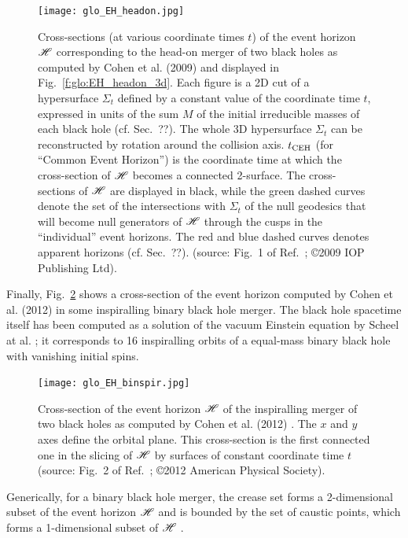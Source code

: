 \begin{figure}
\centerline{\texttt{[image: glo\_EH\_headon.jpg]}}
\caption[]{\label{f:glo:EH_headon} \footnotesize
Cross-sections (at various coordinate times $t$) of the event horizon $\mathscr{H}$ corresponding
to the head-on merger of two black holes as computed by Cohen et al. (2009) \cite{CohenPS09}
and displayed in Fig.~\ref{f:glo:EH_headon_3d}.
Each figure is a 2D cut of a hypersurface $\Sigma_t$ defined by a constant
value of the coordinate time $t$, expressed in units of the sum $M$ of the initial irreducible masses of each black
hole (cf. Sec.~??). The whole 3D hypersurface $\Sigma_t$ can be reconstructed
by rotation around the collision axis.
$t_{\rm CEH}$ (for ``Common Event Horizon'')
is the coordinate time at which the cross-section of $\mathscr{H}$ becomes a connected
2-surface.
The cross-sections of $\mathscr{H}$ are displayed
in black, while the green dashed curves denote the set of the intersections
with $\Sigma_t$ of the null geodesics that
will become null generators of $\mathscr{H}$ through the cusps in the
``individual'' event horizons.
The red and blue dashed curves denotes apparent horizons (cf. Sec.~??).
(source: Fig.~1 of Ref.~\cite{CohenPS09}; \copyright  2009 IOP Publishing Ltd).}
\end{figure}

Finally, Fig.~\ref{f:glo:EH_binspir} shows a cross-section
of the event horizon computed by Cohen et al. (2012) \cite{CohenKS12}
in some inspiralling binary black hole merger. The
black hole spacetime itself has been computed as a solution of the vacuum
Einstein equation by Scheel at al. \cite{ScheeBCKMP09}; it corresponds to
16 inspiralling orbits of a equal-mass binary black hole with vanishing initial
spins.

\begin{figure}
\centerline{\texttt{[image: glo\_EH\_binspir.jpg]}}
\caption[]{\label{f:glo:EH_binspir} \footnotesize
Cross-section of the event horizon $\mathscr{H}$ of the inspiralling merger of
two black holes as computed by Cohen et al. (2012) \cite{CohenKS12}.
The $x$ and $y$ axes define the orbital plane.
This cross-section is the first connected one in the slicing of $\mathscr{H}$
by surfaces of constant coordinate time $t$
(source: Fig.~2 of Ref.~\cite{CohenKS12}; \copyright 2012 American Physical Society).}
\end{figure}

Generically, for a binary black hole merger,
the crease set forms a 2-dimensional subset of the event horizon
$\mathscr{H}$ and is bounded by the set of caustic points, which forms a 1-dimensional
subset of $\mathscr{H}$ \cite{Siino98a,Siino98b,HusaW99,CohenKS12}.


